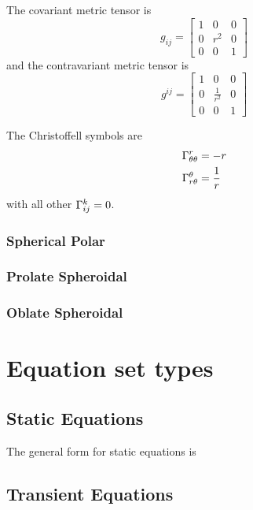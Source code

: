 The covariant metric tensor is
\begin{equation}
  g_{ij}=\begin{bmatrix}
    1 & 0 & 0 \\
    0 & r^{2} & 0 \\
    0 & 0 & 1
  \end{bmatrix}
\end{equation}
and the contravariant metric tensor is
\begin{equation}
  g^{ij}=\begin{bmatrix}
    1 & 0 & 0 \\
    0 & \frac{1}{r^{2}} & 0 \\
    0 & 0 & 1
  \end{bmatrix}
\end{equation}

The Christoffell symbols are
\begin{align}
   \Gamma_{\theta\theta}^{r} &=-r \\
   \Gamma_{r\theta}^{\theta} &=\frac{1}{r}
\end{align}
with all other $ \Gamma_{ij}^{k} =0$.

\subsubsection{Spherical Polar}

\subsubsection{Prolate Spheroidal}

\subsubsection{Oblate Spheroidal}

\section{Equation set types}

\subsection{Static Equations}

The general form for static equations is

\subsection{Transient Equations}

